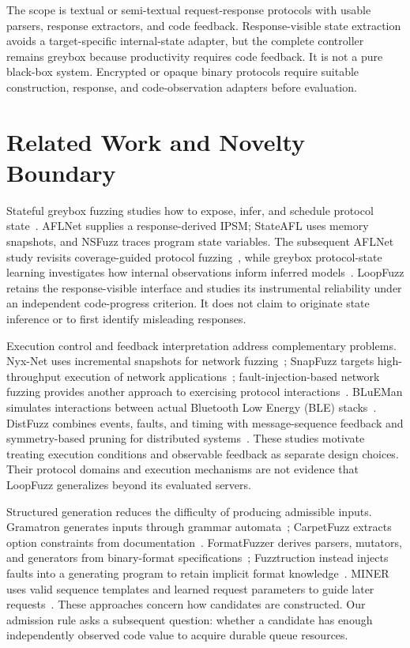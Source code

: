 \documentclass[final,5p,times,number]{elsarticle}
\begin{document}
The scope is textual or semi-textual request-response protocols with usable parsers, response extractors, and code feedback. Response-visible state extraction avoids a target-specific internal-state adapter, but the complete controller remains greybox because productivity requires code feedback. It is not a pure black-box system. Encrypted or opaque binary protocols require suitable construction, response, and code-observation adapters before evaluation.

\section{Related Work and Novelty Boundary}
Stateful greybox fuzzing studies how to expose, infer, and schedule protocol state~\cite{aflnet,stateafl,nsfuzz,sgf_usenix22}. AFLNet supplies a response-derived IPSM; StateAFL uses memory snapshots, and NSFuzz traces program state variables. The subsequent AFLNet study revisits coverage-guided protocol fuzzing~\cite{aflnet5years2025}, while greybox protocol-state learning investigates how internal observations inform inferred models~\cite{stateinspector2022}. LoopFuzz retains the response-visible interface and studies its instrumental reliability under an independent code-progress criterion. It does not claim to originate state inference or to first identify misleading responses.

Execution control and feedback interpretation address complementary problems. Nyx-Net uses incremental snapshots for network fuzzing~\cite{nyxnet2022}; SnapFuzz targets high-throughput execution of network applications~\cite{snapfuzz2022}; fault-injection-based network fuzzing provides another approach to exercising protocol interactions~\cite{fuzztructionnet2024}. BLuEMan simulates interactions between actual Bluetooth Low Energy (BLE) stacks~\cite{blueman2025}. DistFuzz combines events, faults, and timing with message-sequence feedback and symmetry-based pruning for distributed systems~\cite{distfuzz2025}. These studies motivate treating execution conditions and observable feedback as separate design choices. Their protocol domains and execution mechanisms are not evidence that LoopFuzz generalizes beyond its evaluated servers.

Structured generation reduces the difficulty of producing admissible inputs. Gramatron generates inputs through grammar automata~\cite{gramatron_effective_grammar_aware_2021}; CarpetFuzz extracts option constraints from documentation~\cite{carpetfuzz_documentation_2023}. FormatFuzzer derives parsers, mutators, and generators from binary-format specifications~\cite{formatfuzzer}; Fuzztruction instead injects faults into a generating program to retain implicit format knowledge~\cite{fuzztruction2023}. MINER uses valid sequence templates and learned request parameters to guide later requests~\cite{miner2023}. These approaches concern how candidates are constructed. Our admission rule asks a subsequent question: whether a candidate has enough independently observed code value to acquire durable queue resources.
\end{document}
